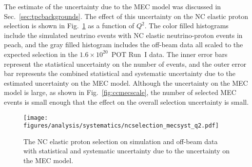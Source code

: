     The estimate of the uncertainty due to the MEC model was discussed in
    Sec.~\ref{sec:tpcbackgrounds}. The effect of this uncertainty on the NC
    elastic proton selection is shown in Fig.~\ref{fig:systmec} as a function
    of $Q^2$. The color filled histograms include the simulated neutrino events
    with NC elastic neutrino-proton events in peach, and the gray filled
    histogram includes the off-beam data all scaled to the expected selection
    in the $1.6\times 10^{20}$~POT Run~I data. The inner error bars represent
    the statistical uncertainty on the number of events, and the outer error
    bar represents the combined statistical and systematic uncertainty due to
    the estimated uncertainty on the MEC model. Although the uncertainty on the
    MEC model is large, as shown in Fig.~\ref{fig:ccmecscale}, the number of
    selected MEC events is small enough that the effect on the overall
    selection uncertainty is small.
    \begin{figure}[ht]
      \centering
      \texttt{[image: figures/analysis/systematics/ncselection\_mecsyst\_q2.pdf]}
      \caption{The NC elastic proton selection on simulation and off-beam data
      with statistical and systematic uncertainty due to the uncertainty on the
      MEC model.}
      \label{fig:systmec}
    \end{figure}

